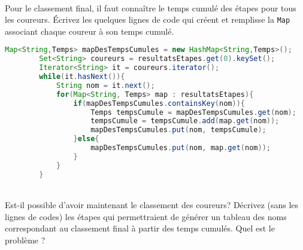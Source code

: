 \documentclass[iutinfo,a4paper,nocorrections,10pt]{ustl-tdtp}
\begin{document}
~\\ \question Pour le classement final, il faut connaître
le temps cumulé des étapes pour tous les coureurs. Écrivez les
quelques lignes de code qui créent et remplisse la \texttt{Map}
associant chaque coureur à son temps cumulé.

\begin{correction}
{\color{red}
\begin{lstlisting}[language=Java]
Map<String,Temps> mapDesTempsCumules = new HashMap<String,Temps>();
		Set<String> coureurs = resultatsEtapes.get(0).keySet(); 
		Iterator<String> it = coureurs.iterator();
		while(it.hasNext()){
			String nom = it.next();
			for(Map<String, Temps> map : resultatsEtapes){
				if(mapDesTempsCumules.containsKey(nom)){
					Temps tempsCumule = mapDesTempsCumules.get(nom);
					tempsCumule = tempsCumule.add(map.get(nom));
					mapDesTempsCumules.put(nom, tempsCumule);
				}else{
					mapDesTempsCumules.put(nom, map.get(nom));
				}
			}
		}
\end{lstlisting}
}
\end{correction}

~\\ \question  Est-il possible d'avoir maintenant le
classement des coureurs? Décrivez (sans les lignes de codes) les étapes qui permettraient de générer un tableau des noms correspondant au
classement final à partir des temps cumulés. Quel est le problème ?
\end{document}
